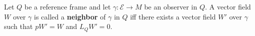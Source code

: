 Let $Q$ be a reference frame and let $\gamma: \mathcal{E} \rightarrow M$ be an observer in $Q$. A vector field $W$ over $\gamma$ is called a \textbf{neighbor} of $\gamma$ in $Q$ iff there exists a vector field $W'$ over $\gamma$ such that $pW' = W$ and $L_Q W' = 0$.
